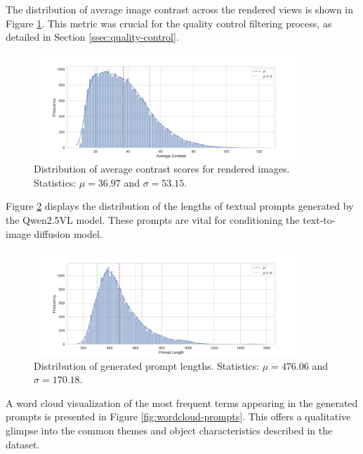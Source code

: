 The distribution of average image contrast across the rendered views is shown in Figure \ref{fig:dist-avg-contrast}. This metric was crucial for the quality control filtering process, as detailed in Section \ref{ssec:quality-control}.

\begin{figure}[h]
  \centering
  \includegraphics[width=0.9\textwidth]{images/data/objaverse_visualizations/distribution_average_contrast.png}
  \caption{Distribution of average contrast scores for rendered images. Statistics: $\mu = 36.97$ and $\sigma = 53.15$.}
  \label{fig:dist-avg-contrast}
\end{figure}

Figure \ref{fig:dist-prompt-length} displays the distribution of the lengths of textual prompts generated by the Qwen2.5VL model. These prompts are vital for conditioning the text-to-image diffusion model.

\begin{figure}[h]
  \centering
  \includegraphics[width=0.9\textwidth]{images/data/objaverse_visualizations/distribution_prompt_length.png}
  \caption{Distribution of generated prompt lengths. Statistics: $\mu = 476.06$ and $\sigma = 170.18$.}
  \label{fig:dist-prompt-length}
\end{figure}

A word cloud visualization of the most frequent terms appearing in the generated prompts is presented in Figure \ref{fig:wordcloud-prompts}. This offers a qualitative glimpse into the common themes and object characteristics described in the dataset.

